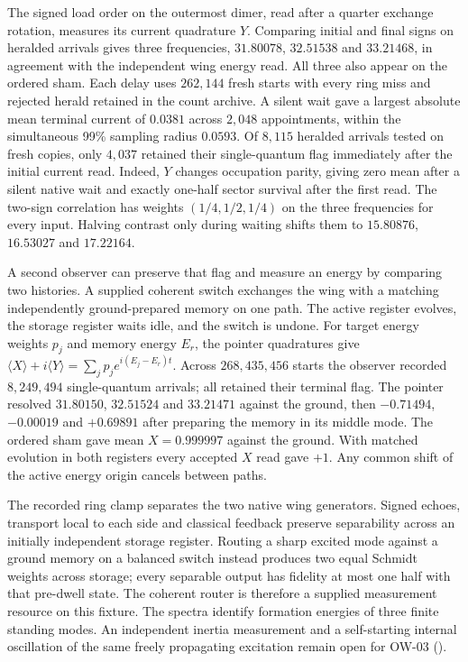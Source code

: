\documentclass[11pt]{article}
\theoremstyle{definition}
\theoremstyle{remark}
\theoremstyle{plain}
\begin{document}
The signed load order on the outermost dimer, read after a quarter
exchange rotation, measures its current quadrature $Y$. Comparing
initial and final signs on heralded arrivals gives three frequencies,
$31.80078$, $32.51538$ and $33.21468$, in agreement with the independent
wing energy read. All three also appear on the ordered sham. Each delay
uses $262{,}144$ fresh starts with every ring miss and rejected herald
retained in the count archive. A silent wait gave a largest absolute
mean terminal current of $0.0381$ across $2{,}048$ appointments, within
the simultaneous 99\% sampling radius $0.0593$. Of $8{,}115$ heralded
arrivals tested on fresh copies, only $4{,}037$ retained their
single-quantum flag immediately after the initial current read.
Indeed, $Y$ changes occupation parity, giving zero mean after a silent
native wait and exactly one-half sector survival after the first read.
The two-sign correlation has weights $(1/4,1/2,1/4)$ on the three
frequencies for every input. Halving contrast only during waiting
shifts them to $15.80876$, $16.53027$ and $17.22164$.

A second observer can preserve that flag and measure an energy by
comparing two histories. A supplied coherent switch exchanges the
wing with a matching independently ground-prepared memory on one
path. The active register evolves, the storage register waits idle,
and the switch is undone. For target energy weights $p_j$ and memory
energy $E_r$, the pointer quadratures give
$\langle X\rangle+i\langle Y\rangle=\sum_j p_j e^{i(E_j-E_r)t}$.
Across $268{,}435{,}456$ starts the observer recorded $8{,}249{,}494$
single-quantum arrivals; all retained their terminal flag. The pointer
resolved $31.80150$, $32.51524$ and $33.21471$ against the ground,
then $-0.71494$, $-0.00019$ and $+0.69891$ after preparing the memory
in its middle mode. The ordered sham gave mean $X=0.999997$ against
the ground. With matched evolution in both registers every accepted
$X$ read gave $+1$. Any common shift of the active energy origin
cancels between paths.

The recorded ring clamp separates the two native wing generators.
Signed echoes, transport local to each side and classical feedback
preserve separability across an initially independent storage register.
Routing a sharp excited mode against a ground memory on a balanced
switch instead produces two equal Schmidt weights across storage;
every separable output has fidelity at most one half with that
pre-dwell state. The coherent router is therefore a supplied
measurement resource on this fixture. The spectra identify formation
energies of three finite standing modes. An independent inertia
measurement and a self-starting internal oscillation of the same freely
propagating excitation remain open for OW-03
().
\end{document}
